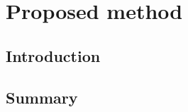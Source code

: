 
\chapter{Proposed method} \label{chap:method}
    \section{Introduction}
    
    
    
    \section{Summary}
